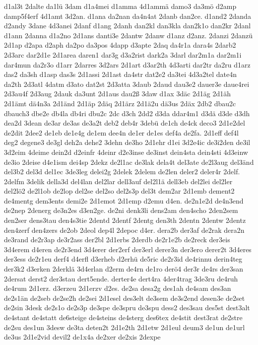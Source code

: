 {d1al3t
2dalte
da1lü
3dam
d1a4mei
d1amma
4d1ammä
damo3
da3mö
d2amp
damp5f4erf
4d1amt
3d2an.
d1ana
da2nan
da4n4at
2danb
dan2ce.
d1and2
2danda
d2andy
3dane
4d3anei
2danf
d1ang
2danh
dan2kl
dan3kla
dan2k1o
dan2kr
2danl
d1ann
2danna
d1a2no
2d1ans
danti3e
2dantw
2danw
d1anz
d2anz.
2danzi
2danzü
2d1ap
d2apa
d2aph
da2po
da3pos
4dapp
d3apte
2daq
da4r1a
dara4s
2darb2
2d3arc
dar2d1e
2d1area
daren1
dar3g
d3a2rist
dark2a
3darl
dar2m1a
dar2m1i
dar4mun
da2r3o
d1arr
2darres
3d2ars
2d1art
d3ar2th
4d3arti
dar2tr
da2ru
d1arz
das2
da3sh
d1asp
das3s
2d1assi
2d1ast
da4str
dat2e2
da3tei
4d3a2tel
date4n
da2th
2d3atl
4datm
d3ato
dat2st
2d3atta
3daub
2daud
dau3e2
dauer3e
daue4rei
2d3au4f
2d3aug
2dauk
da3unt
2d1aus
dau2ß
3daw
d1ax
3däc
2d1äg
2d1äh
2d1ämt
dä4n3a
2d1änd
2d1äp
2däq
2d1ärz
2d1ä2u
dä3us
2däx
2db2
dbau2c
dbauch3
dbe2e
db4la
db4ri
dbu2c
2dc
d3ch
2dd2
d3da
ddar4m1
d3dä
d3de
d3dh
dea2d
3dean
de3ar
de3as
de3a2t
deb2
deb4r
3debü
de1ch
de4ck
deco3
2d1e2del
de2dit
2dee2
de1eb
de1e4g
de1em
dee4n
de1er
de1es
def4a
de2fa.
2d1eff
def4l
deg2
degene3
de3gl
deh2a
dehe2
3dehn
de3ho
2d1ehr
d1ei
3d2e4ic
de3i2den
de3il
3d2eim
4deime
dein2d
d2einfr
4deinr
d2e3inse
de3inst
dein4sta
dein4sti
4d3einw
de3io
2deise
d4e1ism
dei4sp
2dekz
de2l1ac
de3lak
dela4t
del3ate
de2l3aug
del3änd
del3b2
del3d
del1ec
3de3leg
delei2g
2delek
2delem
de2len
deler2
deler4r
2delf.
2delfm
3delik
della3d
del4lan
del2lar
dell3auf
del2l1ä
dell3eb
del2lei
del2ler
del2lö2
de2l1ob
de2lop
del2se
del2so
del2s3p
del3t
dem2ar
2d1emb
dement2
de4mentg
dem3ents
demi2e
2d1emot
2d1emp
d2emu
d4en.
de2n1e2d
de4n3end
de2nep
2denerg
de3n2es
d3en2ge.
de2ni
denk3li
dens2am
den4scho
2den2sem
den2ser
dens3tau
den4s3tie
2dentd
2dentf
2dentg
den3th
2dentn
2dentw
2dentz
den4zerf
den4zers
de2ob
2deol
dep4l
2depoc
d4er.
dera2b
der3af
de2rak
dera2n
de3rand
de2r3ap
de3r2ass
der2bl
2d1erbs
2derdb
de2r1e2b
de2reck
der3eis
3d4erem
d4eren
de2r3end
3d4erer
der2erf
der3erl
derer3n
der3ero
derer2t
3d4eres
der3ess
de2r1eu
derf4
d4erfl
d3erheb
d2erhü
de5ric
de2r3id
de4rinnu
derin4teg
der3k2
d3erken
2derklä
3d4erlan
d2erm
de4rn
de1ro
derö4
der3r
de4rs
der3san
2dersat
derst2
der3stau
dert5ende.
derter4e
dert4ra
4der4trag
3de3ru
de4ruh
de4rum
2d1erz.
d3erzeu
2d1erzv
d2es.
de2sa
desa2g
des1ah
de4sam
des3an
de2s1än
de2seb
de2se2h
de2sei
2d1esel
des3elt
de3sem
de3s2end
desen3e
de2set
de2sin
3desk
de2s1o
de2s3p
de3spe
de3spru
de3spu
dess2
des3sau
des5st
dest3alt
de4stant
de4statt
de6steige
de4steins
de4sterg
des6tex
de4stit
dest3rat
de2stre
de2su
des1un
3desw
de3ta
deten2t
2d1e2th
2d1etw
2d1eul
deum3
de1un
de1url
de3us
2d1e2vid
devil2
de1x4a
de2xer
de2xis
2dexpe
}
